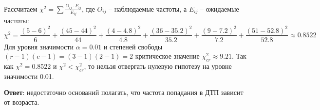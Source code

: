 \documentclass{assignment}
\begin{document}
\begin{enumerate}
    Рассчитаем $\chi^2 = \sum \frac{O_{ij}\cdot E_{ij}}{E_{ij}}$, где $O_{ij}$ -- наблюдаемые частоты, а $E_{ij}$ -- ожидаемые частоты:
    \begin{equation*}
        \chi^2 = \frac{(5-6)^2}{6} + \frac{(45-44)^2}{44} + \frac{(4-4.8)^2}{4.8} + \frac{(36-35.2)^2}{35.2} + \frac{(9-7.2)^2}{7.2} + \frac{(51-52.8)^2}{52.8} \approx 0.8522
    \end{equation*}
    Для уровня значимости $\alpha = 0.01$ и степеней свободы $(r-1)(c-1) = (3-1)(2-1) = 2$ критическое значение $\chi^2_{cr} \approx 9.21$. Так как $\chi^2=0.8522$ и $\chi^2 < \chi^2_{cr}$, то нельзя отвергать нулевую гипотезу на уровне значимости 0.01.

    \textbf{Ответ}: недостаточно оснований полагать, что частота попадания в ДТП зависит от возраста.
    \finish


    






\end{enumerate}
\end{document}
